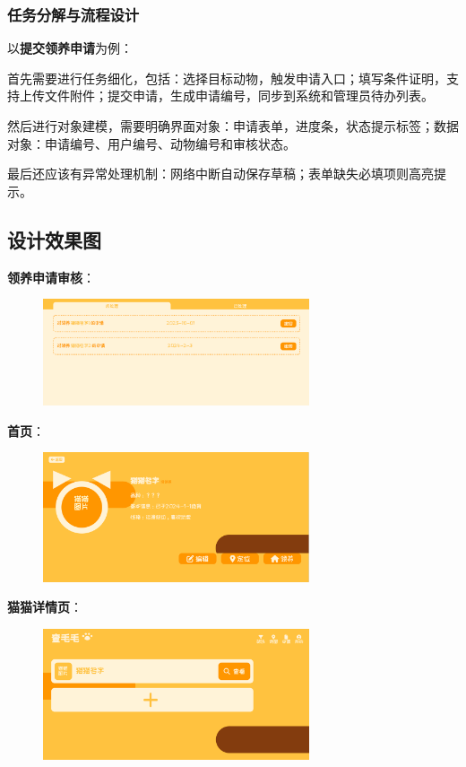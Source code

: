 \documentclass[12pt,a4paper,UTF8]{article}
\begin{document}
\subsubsection{任务分解与流程设计}

以\textbf{提交领养申请}为例：

首先需要进行任务细化，包括：选择目标动物，触发申请入口；填写条件证明，支持上传文件附件；提交申请，生成申请编号，同步到系统和管理员待办列表。

然后进行对象建模，需要明确界面对象：申请表单，进度条，状态提示标签；数据对象：申请编号、用户编号、动物编号和审核状态。

最后还应该有异常处理机制：网络中断自动保存草稿；表单缺失必填项则高亮提示。

\subsection{设计效果图}

\noindent\textbf{领养申请审核}：

\begin{figure}[H]
  \centering
  \includegraphics[width=0.7\textwidth]{figures/UI1.png}
\end{figure}

\noindent\textbf{首页}：

\begin{figure}[H]
  \centering
  \includegraphics[width=0.7\textwidth]{figures/UI2.png}
\end{figure}

\noindent\textbf{猫猫详情页}：

\begin{figure}[H]
  \centering
  \includegraphics[width=0.7\textwidth]{figures/UI3.png}
\end{figure}
\end{document}
